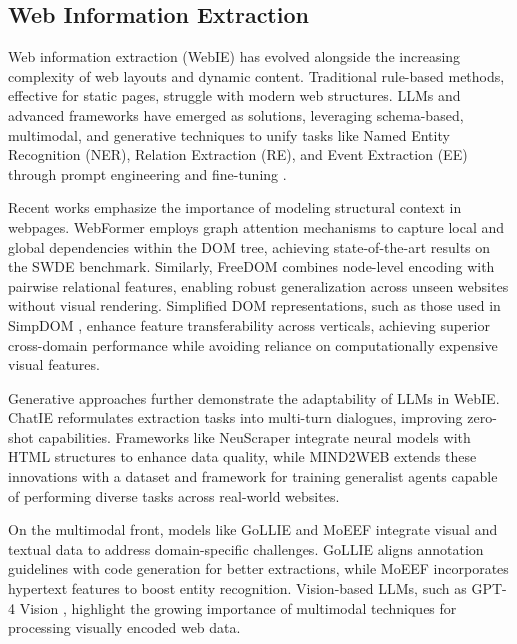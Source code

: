 \documentclass[a4paper]{article}
\begin{document}
\subsection{Web Information Extraction}

Web information extraction (WebIE) has evolved alongside the increasing complexity of web layouts and dynamic content. Traditional rule-based methods, effective for static pages, struggle with modern web structures. LLMs and advanced frameworks have emerged as solutions, leveraging schema-based, multimodal, and generative techniques to unify tasks like Named Entity Recognition (NER), Relation Extraction (RE), and Event Extraction (EE) through prompt engineering and fine-tuning \cite{xu2024largelanguagemodelsgenerative}.

Recent works emphasize the importance of modeling structural context in webpages. WebFormer \cite{wang2022webformerwebpagetransformerstructure} employs graph attention mechanisms to capture local and global dependencies within the DOM tree, achieving state-of-the-art results on the SWDE benchmark. Similarly, FreeDOM \cite{DBLP:journals/corr/abs-2010-10755} combines node-level encoding with pairwise relational features, enabling robust generalization across unseen websites without visual rendering. Simplified DOM representations, such as those used in SimpDOM \cite{zhou2021simplifieddomtreestransferable}, enhance feature transferability across verticals, achieving superior cross-domain performance while avoiding reliance on computationally expensive visual features.

Generative approaches further demonstrate the adaptability of LLMs in WebIE. ChatIE \cite{wei2024chatie} reformulates extraction tasks into multi-turn dialogues, improving zero-shot capabilities. Frameworks like NeuScraper \cite{ahluwalia2024leveraginglargelanguagemodels} integrate neural models with HTML structures to enhance data quality, while MIND2WEB \cite{deng2023mind2webgeneralistagentweb} extends these innovations with a dataset and framework for training generalist agents capable of performing diverse tasks across real-world websites.

On the multimodal front, models like GoLLIE \cite{sainz2024gollieannotationguidelinesimprove} and MoEEF \cite{yang2024hypertextentityextractionwebpage} integrate visual and textual data to address domain-specific challenges. GoLLIE aligns annotation guidelines with code generation for better extractions, while MoEEF incorporates hypertext features to boost entity recognition. Vision-based LLMs, such as GPT-4 Vision \cite{fellman-etal-2024-future}, highlight the growing importance of multimodal techniques for processing visually encoded web data.
\end{document}
